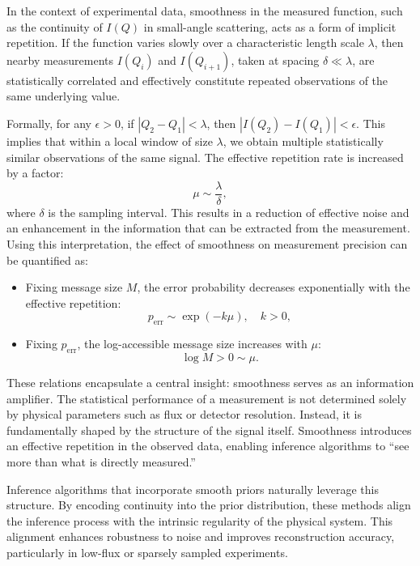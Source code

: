 \documentclass[12pt]{article}
\begin{document}
In the context of experimental data, smoothness in the measured function, such as the continuity of \( I(Q) \) in small-angle scattering, acts as a form of implicit repetition. If the function varies slowly over a characteristic length scale \( \lambda \), then nearby measurements \( I(Q_i) \) and \( I(Q_{i+1}) \), taken at spacing \( \delta \ll \lambda \), are statistically correlated and effectively constitute repeated observations of the same underlying value.

Formally, for any \( \epsilon > 0 \), if \( |Q_2 - Q_1| < \lambda \), then \( |I(Q_2) - I(Q_1)| < \epsilon \). This implies that within a local window of size \( \lambda \), we obtain multiple statistically similar observations of the same signal. The effective repetition rate is increased by a factor:
\begin{equation}
    \mu \sim \frac{\lambda}{\delta},
\end{equation}
where \( \delta \) is the sampling interval. This results in a reduction of effective noise and an enhancement in the information that can be extracted from the measurement.
Using this interpretation, the effect of smoothness on measurement precision can be quantified as:
\begin{itemize}
    \item Fixing message size \( M \), the error probability decreases exponentially with the effective repetition:
    \begin{equation}
        p_{\mathrm{err}} \sim \exp(-k \mu), \quad k > 0,
    \end{equation}
    \item Fixing \( p_{\mathrm{err}} \), the log-accessible message size increases with \( \mu \):
    \begin{equation}
        \log M > 0 \sim \mu.
    \end{equation}
\end{itemize}
These relations encapsulate a central insight: smoothness serves as an information amplifier. The statistical performance of a measurement is not determined solely by physical parameters such as flux or detector resolution. Instead, it is fundamentally shaped by the structure of the signal itself. Smoothness introduces an effective repetition in the observed data, enabling inference algorithms to ``see more than what is directly measured.''

Inference algorithms that incorporate smooth priors naturally leverage this structure. By encoding continuity into the prior distribution, these methods align the inference process with the intrinsic regularity of the physical system. This alignment enhances robustness to noise and improves reconstruction accuracy, particularly in low-flux or sparsely sampled experiments.
\end{document}
